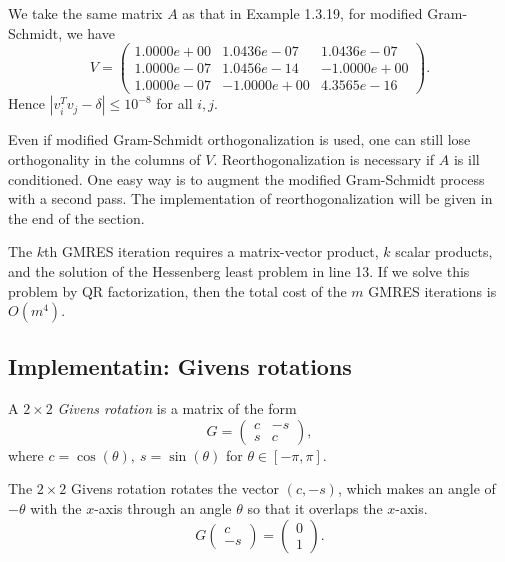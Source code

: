 \begin{exm}
  We take the same matrix $A$ as that in Example 1.3.19, for modified
  Gram-Schmidt, we have
  $$V=\left(
    \begin{array}{ccc}
      1.0000e+00 &1.0436e-07 & 1.0436e-07 \\
      1.0000e-07 & 1.0456e-14 & -1.0000e+00 \\
      1.0000e-07 & -1.0000e+00& 4.3565e-16
    \end{array}\right).
  $$
  Hence $|v_i^Tv_j-\delta|\leq 10^{-8}$ for all $i,j$.
\end{exm}

\begin{rmk}
  Even if modified Gram-Schmidt orthogonalization is used, one can
  still lose orthogonality in the columns of $V$. Reorthogonalization is
  necessary if $A$ is ill conditioned. One easy way is to augment the
  modified Gram-Schmidt process with a second pass. The implementation
  of reorthogonalization will be given in the end of the section.
\end{rmk}

\begin{rmk}
  The $k$th GMRES iteration requires a matrix-vector product, $k$
  scalar products, and the solution of the Hessenberg least problem in
  line 13. If we solve this problem by QR factorization, then the
  total cost of the $m$ GMRES iterations is $O(m^4).$ 
\end{rmk}

\subsection{Implementatin: Givens rotations}
\label{sec:3.5}

\begin{defi}
  A $2\times 2$ \emph{Givens rotation} is a matrix of the form
  \begin{equation}
    \label{eq:3.12}
    G=\left(
      \begin{array}{cc}
        c & -s \\ s & c
      \end{array}
    \right),
  \end{equation}
  where $c=\cos(\theta),\ s=\sin(\theta)$ for $\theta\in[-\pi,\pi]$.
\end{defi}

\begin{lemma}
  The $2\times 2$ Givens rotation rotates the vector $(c,-s)$, which
  makes an angle of $-\theta$ with the $x$-axis through an angle
  $\theta$ so that it overlaps the $x$-axis.
  $$
  G\left(
    \begin{array}{c}
      c \\ -s
    \end{array}
  \right)=\left(
    \begin{array}{c}
      0 \\ 1
    \end{array}
  \right).$$
\end{lemma}

